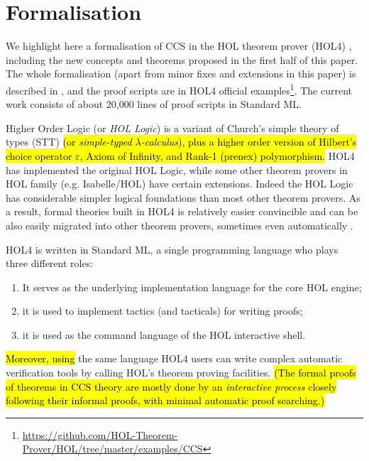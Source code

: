 \section{Formalisation}
\label{s:for}
We highlight here a formalisation of CCS
in the HOL theorem
prover (HOL4) \cite{slind2008brief},
including the new concepts and theorems proposed in the first half of
this paper.
The whole formalisation (apart from minor fixes and extensions in this
paper)
is described in \cite{Tian:2017wrba}, and the
proof scripts are in HOL4 official
examples\footnote{\url{https://github.com/HOL-Theorem-Prover/HOL/tree/master/examples/CCS}}. The
current work consists of about 20,000 lines of proof scripts in Standard ML.

Higher Order Logic (or \emph{HOL Logic}) \cite{hollogic} is a variant of
Church’s simple theory of types (STT) \cite{church1940formulation}
\hl{(or \emph{simple-typed $\lambda$-calculus}),
plus a higher order version of Hilbert's choice operator $\varepsilon$,
Axiom of Infinity, and Rank-1 (prenex) polymorphism.}
HOL4 has implemented the original HOL Logic, 
while some other theorem provers in HOL family (e.g. Isabelle/HOL) have
certain extensions.
Indeed the HOL Logic has considerable simpler logical
foundations than most other theorem provers. %
As a result,
formal theories built in HOL4 is relatively easier convincible and can
be also easily migrated into other theorem provers,
sometimes even automatically \cite{hurd2011opentheory}.

HOL4 is written in Standard ML, a single programming language who
plays three different roles:
\begin{enumerate}
\item It serves as the underlying implementation language for the core HOL engine;
\item it is used to implement tactics (and tacticals) for writing proofs;
\item it is used as the command language of the HOL interactive shell.
\end{enumerate}
\hl{Moreover, using} the same language HOL4 users can write complex automatic
verification tools by calling HOL's theorem proving
facilities. \hl{(The formal proofs of theorems in CCS theory
are mostly done by an \emph{interactive process} closely following
their informal proofs, with minimal automatic proof searching.)}


